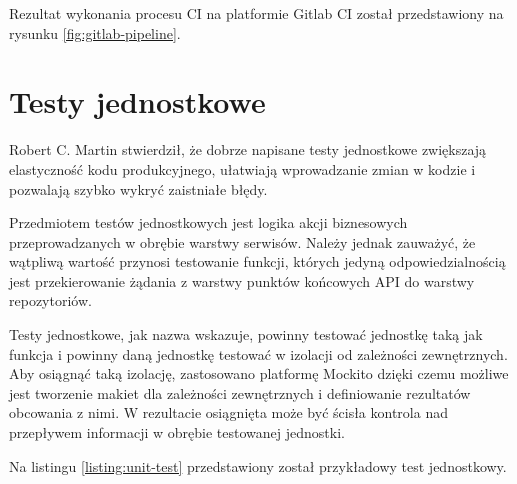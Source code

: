 \par
Rezultat wykonania procesu CI na platformie Gitlab CI został przedstawiony na rysunku \ref{fig:gitlab-pipeline}.


\section{Testy jednostkowe}

Robert C. Martin stwierdził, że dobrze napisane testy jednostkowe zwiększają elastyczność kodu produkcyjnego,
ułatwiają wprowadzanie zmian w kodzie i pozwalają szybko wykryć zaistniałe błędy\cite{book:czysty-kod}.

\par
Przedmiotem testów jednostkowych jest logika akcji biznesowych przeprowadzanych w obrębie warstwy serwisów.
Należy jednak zauważyć, że wątpliwą wartość przynosi testowanie funkcji,
których jedyną odpowiedzialnością jest przekierowanie żądania z warstwy punktów końcowych API do warstwy repozytoriów.

\par
Testy jednostkowe, jak nazwa wskazuje, powinny testować jednostkę taką jak funkcja i powinny daną jednostkę testować w izolacji od zależności zewnętrznych\cite{book:testy-jednostkowe}.
Aby osiągnąć taką izolację, zastosowano platformę Mockito dzięki czemu możliwe jest tworzenie makiet dla zależności zewnętrznych i definiowanie rezultatów obcowania z nimi.
W rezultacie osiągnięta może być ścisła kontrola nad przepływem informacji w obrębie testowanej jednostki.

\par
Na listingu \ref{listing:unit-test} przedstawiony został przykładowy test jednostkowy.

